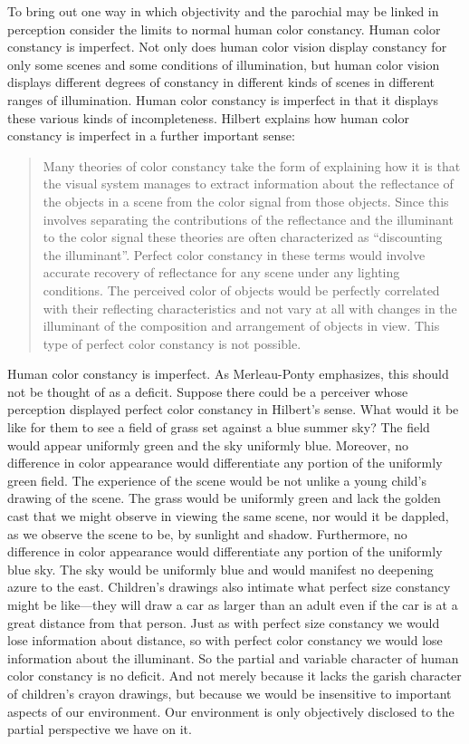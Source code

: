 To bring out one way in which objectivity and the parochial may be linked in perception consider the limits to normal human color constancy. Human color constancy is imperfect. Not only does human color vision display constancy for only some scenes and some conditions of illumination, but human color vision displays different degrees of constancy in different kinds of scenes in different ranges of illumination. Human color constancy is imperfect in that it displays these various kinds of incompleteness. Hilbert explains how human color constancy is imperfect in a further important sense:
	\begin{quote}
		Many theories of color constancy take the form of explaining how it is that the visual system manages to extract information about the reflectance of the objects in a scene from the color signal from those objects. Since this involves separating the contributions of the reflectance and the illuminant to the color signal these theories are often characterized as ``discounting the illuminant''. Perfect color constancy in these terms would involve accurate recovery of reflectance for any scene under any lighting conditions. The perceived color of objects would be perfectly correlated with their reflecting characteristics and not vary at all with changes in the illuminant of the composition and arrangement of objects in view. This type of perfect color constancy is not possible. \citep[143]{Hilbert:2007qy}
	\end{quote}
Human color constancy is imperfect. As Merleau-Ponty emphasizes, this should not be thought of as a deficit. Suppose there could be a perceiver whose perception displayed perfect color constancy in Hilbert's sense. What would it be like for them to see a field of grass set against a blue summer sky? The field would appear uniformly green and the sky uniformly blue. Moreover, no difference in color appearance would differentiate any portion of the uniformly green field. The experience of the scene would be not unlike a young child's drawing of the scene. The grass would be uniformly green and lack the golden cast that we might observe in viewing the same scene, nor would it be dappled, as we observe the scene to be, by sunlight and shadow. Furthermore, no difference in color appearance would differentiate any portion of the uniformly blue sky. The sky would be uniformly blue and would manifest no deepening azure to the east. Children's drawings also intimate what perfect size constancy might be like---they will draw a car as larger than an adult even if the car is at a great distance from that person. Just as with perfect size constancy we would lose information about distance, so with perfect color constancy we would lose information about the illuminant. So the partial and variable character of human color constancy is no deficit. And not merely because it lacks the garish character of children's crayon drawings, but because we would be insensitive to important aspects of our environment. Our environment is only objectively disclosed to the partial perspective we have on it.

